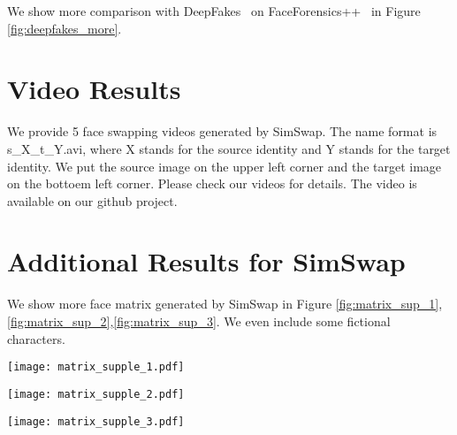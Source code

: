 \documentclass[sigconf]{acmart}
\begin{document}
We show more comparison with DeepFakes~\cite{DeepFakes} on FaceForensics++~\cite{DBLP:faceforensics} in Figure \ref{fig:deepfakes_more}.




\section{Video Results}

We provide 5 face swapping videos generated by SimSwap. The name format is s\_X\_t\_Y.avi, where X stands for the source identity and Y stands for the target identity. We put the source image on the upper left corner and the target image on the bottoem left corner.  Please check our videos for details.
The video is available on our github project.
\section{Additional Results for SimSwap}

We show more face matrix generated by SimSwap in Figure \ref{fig:matrix_sup_1},\ref{fig:matrix_sup_2},\ref{fig:matrix_sup_3}. We even include some fictional characters.

\begin{figure*}[!ht]
  \centering
  \texttt{[image: matrix\_supple\_1.pdf]}
  \caption{Male Face Matrix generated by SimSwap. The identities in row 1 and row 7 are fictional characters. Our method manages to generate high fidelity face swapping result.}
  \label{fig:matrix_sup_1}
\end{figure*}

\begin{figure*}[!ht]
  \centering
  \texttt{[image: matrix\_supple\_2.pdf]}
  \caption{Female Face Matrix generated by SimSwap. The identities in row 4 and row 7 are fictional characters. Our method manages to generate high fidelity face swapping result.}
  \label{fig:matrix_sup_2}
\end{figure*}

\begin{figure*}[!ht]
  \centering
  \texttt{[image: matrix\_supple\_3.pdf]}
  \caption{Expression Face Matrix generated by SimSwap. Some identities in this matrix have extraggerated expressions. Our method is still to generate decent face swapping result.}
  \label{fig:matrix_sup_3}
\end{figure*}
\end{document}
